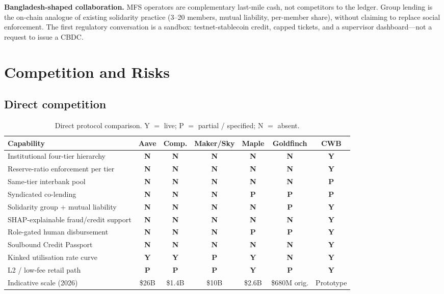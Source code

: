 \documentclass[11pt,a4paper]{article}
\newcommand{\tablehead}{\rowcolor{HeadShade}\bfseries}
\newcommand{\Y}{\textbf{Y}}
\newcommand{\N}{\textbf{N}}
\newcommand{\Pmark}{\textbf{P}}
\begin{document}
\textbf{Bangladesh-shaped collaboration.} MFS operators are complementary last-mile cash, not competitors to the ledger. Group lending is the on-chain analogue of existing solidarity practice (3--20 members, mutual liability, per-member share), without claiming to replace social enforcement. The first regulatory conversation is a sandbox: testnet-stablecoin credit, capped tickets, and a supervisor dashboard---not a request to issue a CBDC.

\section{Competition and Risks}
\label{sec:competition}

\subsection{Direct competition}

\begin{table}[H]
\centering
\footnotesize
\caption{Direct protocol comparison. Y $=$ live; P $=$ partial / specified; N $=$ absent.}
\label{tab:comp}
\begin{tabular}{@{}p{3.7cm}cccccc@{}}
\toprule
\tablehead Capability & Aave & Comp. & Maker/Sky & Maple & Goldfinch & \textbf{CWB} \\
\midrule
Institutional four-tier hierarchy & \N & \N & \N & \N & \N & \Y \\
\rowcolor{RowShade}
Reserve-ratio enforcement per tier & \N & \N & \N & \N & \N & \Y \\
Same-tier interbank pool & \N & \N & \N & \N & \N & \Pmark \\
\rowcolor{RowShade}
Syndicated co-lending & \N & \N & \N & \Pmark & \Pmark & \Pmark \\
Solidarity group + mutual liability & \N & \N & \N & \N & \Pmark & \Y \\
\rowcolor{RowShade}
SHAP-explainable fraud/credit support & \N & \N & \N & \N & \N & \Y \\
Role-gated human disbursement & \N & \N & \N & \Pmark & \Pmark & \Y \\
\rowcolor{RowShade}
Soulbound Credit Passport & \N & \N & \N & \N & \N & \Y \\
Kinked utilisation rate curve & \Y & \Y & \Pmark & \Y & \N & \Y \\
\rowcolor{RowShade}
L2 / low-fee retail path & \Pmark & \Pmark & \Pmark & \Y & \Pmark & \Y \\
Indicative scale (2026) & \$26B & \$1.4B & \$10B & \$2.6B & \$680M orig. & Prototype \\
\bottomrule
\end{tabular}
\end{table}
\end{document}
